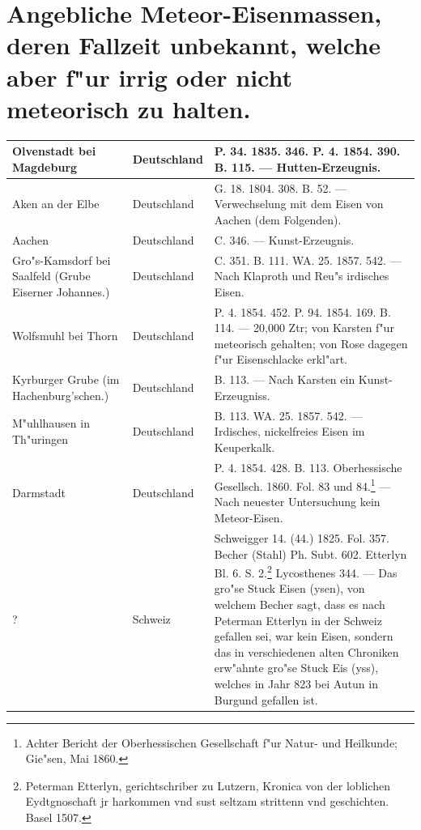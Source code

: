 \documentclass[a4paper, 8pt, oneside, polutonikogreek, german]{article}
\begin{document}
\section{Angebliche Meteor-Eisenmassen, deren Fallzeit unbekannt, welche aber f"ur irrig oder nicht meteorisch zu halten.}
\begin{table}[H]
    \centering
    \footnotesize
    \begin{longtable}{|p{58mm}|p{20mm}|p{80mm}|}
    \hline
        Olvenstadt bei Magdeburg & Deutschland & P. 34. 1835. 346. P. 4. 1854. 390. B. 115. --- Hutten-Erzeugnis. \\ \hline
        Aken an der Elbe & Deutschland & G. 18. 1804. 308. B. 52. --- Verwechselung mit dem Eisen von Aachen (dem Folgenden). \\ \hline
        Aachen & Deutschland & C. 346. --- Kunst-Erzeugnis. \\ \hline
        Gro"s-Kamsdorf bei Saalfeld (Grube Eiserner Johannes.) & Deutschland & C. 351. B. 111. WA. 25. 1857. 542. --- Nach Klaproth und Reu"s irdisches Eisen. \\ \hline
        Wolfsmuhl bei Thorn & Deutschland & P. 4. 1854. 452. P. 94. 1854. 169. B. 114. --- 20,000 Ztr; von Karsten f"ur meteorisch gehalten; von Rose dagegen f"ur Eisenschlacke erkl"art. \\ \hline
        Kyrburger Grube (im Hachenburg’schen.) & Deutschland & B. 113. --- Nach Karsten ein Kunst-Erzeugniss. \\ \hline
        M"uhlhausen in Th"uringen & Deutschland & B. 113. WA. 25. 1857. 542. --- Irdisches, nickelfreies Eisen im Keuperkalk. \\ \hline
        Darmstadt & Deutschland & P. 4. 1854. 428. B. 113. Oberhessische Gesellsch. 1860. Fol. 83 und 84.\footnote{Achter Bericht der Oberhessischen Gesellschaft f"ur Natur- und Heilkunde; Gie"sen, Mai 1860.} --- Nach neuester Untersuchung kein Meteor-Eisen. \\ \hline
        ? & Schweiz & Schweigger 14. (44.) 1825. Fol. 357. Becher (Stahl) Ph. Subt. 602. Etterlyn Bl. 6. S. 2.\footnote{Peterman Etterlyn, gerichtschriber zu Lutzern, Kronica von der loblichen Eydtgnoschaft jr harkommen vnd sust seltzam strittenn vnd geschichten. Basel 1507.} Lycosthenes 344. --- Das gro"se Stuck Eisen (ysen), von welchem Becher sagt, dass es nach Peterman Etterlyn in der Schweiz gefallen sei, war kein Eisen, sondern das in verschiedenen alten Chroniken erw"ahnte gro"se Stuck Eis (yss), welches in Jahr 823 bei Autun in Burgund gefallen ist. \\ \hline

\end{longtable}
\end{table}
\end{document}
